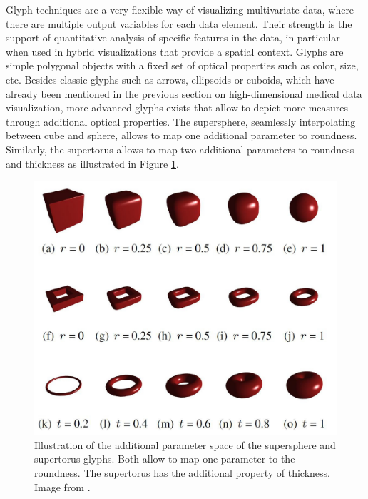 Glyph techniques are a very flexible way of visualizing multivariate data, where there are multiple output variables for each data element.
Their strength is the support of quantitative analysis of specific features in the data, in particular when used in hybrid visualizations that provide a spatial context.
Glyphs are simple polygonal objects with a fixed set of optical properties such as color, size, etc.
Besides classic glyphs such as arrows, ellipsoids or cuboids, which have already been mentioned in the previous section on high-dimensional medical data visualization, more advanced glyphs exists that allow to depict more measures through additional optical properties.
The supersphere, seamlessly interpolating between cube and sphere, allows to map one additional parameter to roundness.
Similarly, the supertorus allows to map two additional parameters to roundness and thickness as illustrated in Figure \ref{fig:background:superquadric-glyphs}.
\begin{figure}[ht]
	\centering
	\includegraphics[width=0.75\linewidth]{figures/background/superquadric-glyphs.jpg}
	\caption{
		Illustration of the additional parameter space of the supersphere and supertorus glyphs.
		Both allow to map one parameter to the roundness.
		The supertorus has the additional property of thickness.
		Image from \cite{Ropinski:2007:Surfaceglyphs}.
	}
	\label{fig:background:superquadric-glyphs}
\end{figure}

